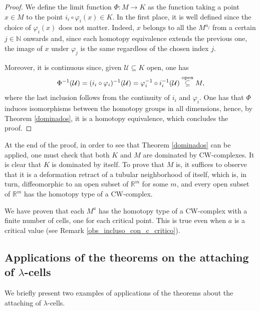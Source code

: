 \begin{proof}
    We define the limit function $\Phi:M\to K$ as the function taking a point $x\in M$ to the point $i_i\circ \varphi_i(x)\in K$. In the first place, it is well defined since the choice of $\varphi_i(x)$ does not matter. Indeed, $x$ belongs to all the $M^{a_j}$ from a certain $j\in\mathbb{N}$ onwards and, since each homotopy equivalence extends the previous one, the image of $x$ under $\varphi_j$ is the same regardless of the chosen index $j$.

    Moreover, it is continuous since, given $\mathcal{U}\subseteq K$ open, one has
    \begin{equation*}
        \Phi^{-1}(\mathcal{U})= (i_i\circ \varphi_i)^{-1}(\mathcal{U})= \varphi_i^{-1}\circ i_i^{-1}(\mathcal{U}) \overset{\text{\scriptsize open}}{\subseteq} M,
    \end{equation*}
    where the last inclusion follows from the continuity of $i_i$ and $\varphi_i$. One has that $\Phi$ induces isomorphisms between the homotopy groups in all dimensions, hence, by Theorem \ref{dominados}, it is a homotopy equivalence, which concludes the proof.

\end{proof}
\begin{remark}
    At the end of the proof, in order to see that Theorem \ref{dominados} can be applied, one must check that both $K$ and $M$ are dominated by CW-complexes. It is clear that $K$ is dominated by itself. To prove that $M$ is, it suffices to observe that it is a deformation retract of a tubular neighborhood of itself, which is, in turn, diffeomorphic to an open subset of $\mathbb{R}^m$ for some $m$, and every open subset of $\mathbb{R}^m$ has the homotopy type of a CW-complex.
\end{remark}

\begin{remark}
    We have proven that each $M^a$ has the homotopy type of a CW-complex with a finite number of cells, one for each critical point. This is true even when $a$ is a critical value (see Remark \ref{obs_incluso_con_c_critico}).
\end{remark}




\newpage
\subsection{Applications of the theorems on the attaching of $\lambda$-cells}\label{subsec:aplicaciones}
We briefly present two examples of applications of the theorems about the attaching of $\lambda$-cells.

